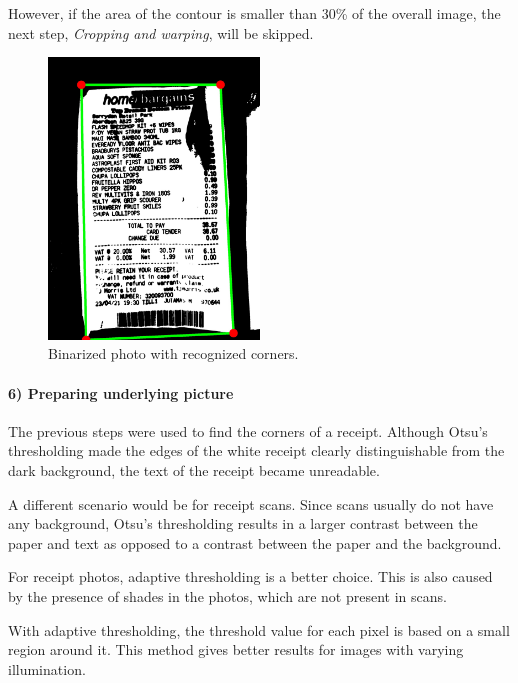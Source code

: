 \documentclass[
  digital, %
  table,   %
  oneside, %
  lof,     %
  lot,     %
]{fithesis3}
\begin{document}
However, if the area of the contour is smaller than 30\% of the overall image, the next step, \textit{Cropping and warping}, will be skipped.

\begin{figure}
    \begin{center}
        \includegraphics[width=0.5\textwidth]{figures/image_processing/points_and_edges}
    \end{center}
    \caption{Binarized photo with recognized corners.}
    \label{fig:points_and_edges}
\end{figure}

\paragraph{6) Preparing underlying picture} The previous steps were used to find the corners of a receipt. Although Otsu's thresholding made the edges of the white receipt clearly distinguishable from the dark background, the text of the receipt became unreadable. 

A different scenario would be for receipt scans. Since scans usually do not have any background, Otsu's thresholding results in a larger contrast between the paper and text as opposed to a contrast between the paper and the background.

For receipt photos, adaptive thresholding is a better choice. This is also caused by the presence of shades in the photos, which are not present in scans.

With adaptive thresholding, the threshold value for each pixel is based on a small region around it. This method gives better results for images with varying illumination. \cite{opencvtresholding}
\end{document}
